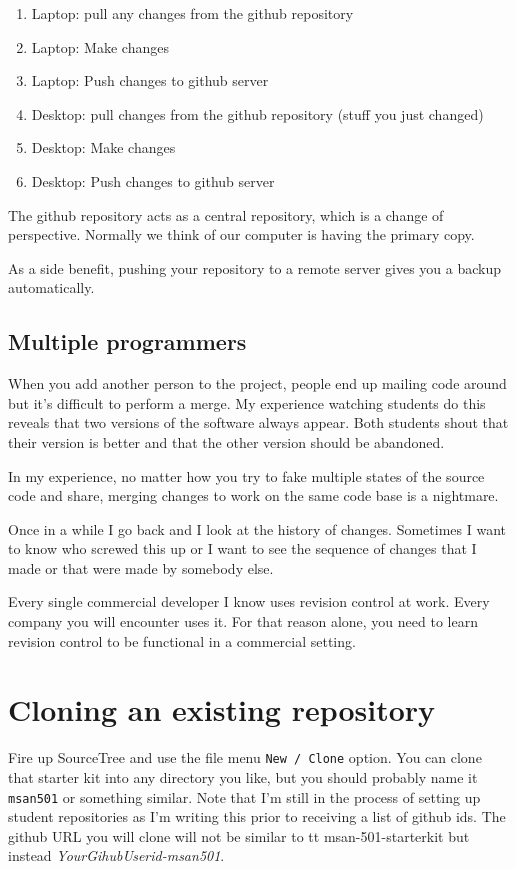 \documentclass[titlepage]{tufte-book}
\begin{document}
\begin{enumerate}
\item Laptop: pull any changes from the github repository
\item Laptop: Make changes
\item Laptop: Push changes to github server
\item Desktop: pull changes from the github repository (stuff you just changed)
\item Desktop: Make changes
\item Desktop: Push changes to github server
\end{enumerate}

The github repository acts as a central repository, which is a change of perspective. Normally we think of our computer is having the primary copy.

As a side benefit, pushing your repository to a remote server gives you a backup automatically.

\subsection{Multiple programmers}

When you add another person to the project, people end up mailing code around but it's difficult to perform a merge. My experience watching students do this reveals that two versions of the software always appear. Both students shout that their version is better and that the other version should be abandoned.

In my experience, no matter how you try to fake multiple states of the source code and share, merging changes to work on the same code base is a nightmare.

Once in a while I go back and I look at the history of changes. Sometimes I want to know who screwed this up or I want to see the sequence of changes that I made or that were made by somebody else.

Every single commercial developer I know uses revision control at work. Every company you will encounter uses it. For that reason alone, you need to learn revision control to be functional in a commercial setting.

\section{Cloning an existing repository}

Fire up SourceTree and use the file menu {\tt New / Clone} option. You can clone that starter kit into any directory you like, but you should probably name it {\tt msan501} or something similar. Note that I'm still in the process of setting up student repositories as I'm writing this prior to receiving a list of github ids. The github URL you will clone will not be similar to {tt msan-501-starterkit} but instead {\em YourGihubUserid-msan501}.
\vspace{5mm}
\end{document}
